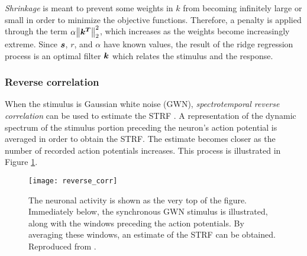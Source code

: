 \emph{Shrinkage} is meant to prevent some weights in $k$ from becoming infinitely large or small in order to minimize the objective functions. Therefore, a penalty is applied through the term $\alpha \norm{\bm{k^T}}_2^2$, which increases as the weights become increasingly extreme. Since $\bm{s}$, $r$, and $\alpha$ have known values, the result of the ridge regression process is an optimal filter $\bm{k}$ which relates the stimulus and the response.

\subsubsection{Reverse correlation}
When the stimulus is Gaussian white noise (GWN), \emph{spectrotemporal reverse correlation} can be used to estimate the STRF \parencite{kleinRobustSpectrotemporalReverse2000}. A representation of the dynamic spectrum of the stimulus portion preceding the neuron's action potential is averaged in order to obtain the STRF. The estimate becomes closer as the number of recorded action potentials increases. This process is illustrated in Figure \ref{fig:rev_corr}.

\begin{figure}
	\centering
	\texttt{[image: reverse\_corr]}
	\caption{The neuronal activity is shown as the very top of the figure. Immediately below, the synchronous GWN stimulus is illustrated, along with the windows preceding the action potentials. By averaging these windows, an estimate of the STRF can be obtained. Reproduced from \textcite{kleinRobustSpectrotemporalReverse2000}.}
	\label{fig:rev_corr}
\end{figure}

